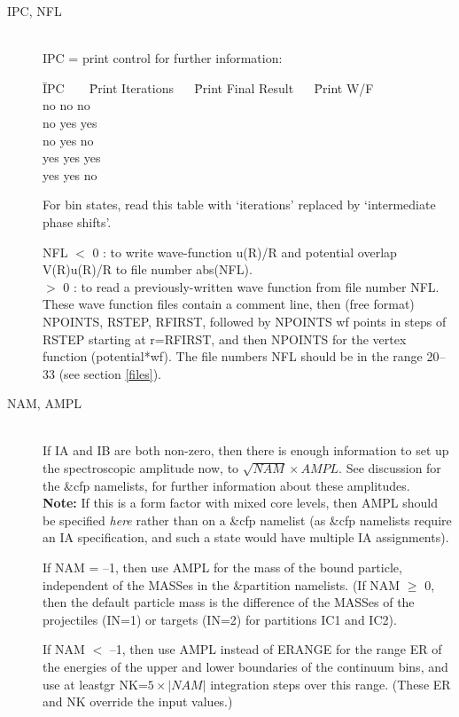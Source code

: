 \documentclass[11pt]{article}
\begin{document}
\begin{description}
\item[IPC, NFL] ~\\
IPC = print control for further information:
%
\begin{tabbing}
\=IPC ~ ~ \=Print Iterations~ ~ \=Print Final Result ~ ~\=Print W/F\\
  \>no \>no \>no\\
  \>no \>yes \>yes\\
  \>no \>yes \>no\\
  \>yes \>yes \>yes\\
  \>yes \>yes \>no\\
\end{tabbing}
For bin states, read this table with `iterations' replaced by `intermediate
phase shifts'.


 NFL
      $<$ 0    : to write wave-function u(R)/R and potential overlap
V(R)u(R)/R to file number abs(NFL).
\\  $>$ 0 : to read a previously-written wave function from file number
NFL.
\\ These wave function files contain a comment line,
then (free format) NPOINTS, RSTEP, RFIRST,
followed by NPOINTS wf points in steps of RSTEP starting at r=RFIRST,
and then NPOINTS for the vertex function (potential*wf).
The file numbers NFL should be in the range 20--33 (see section \ref{files}).

\item[NAM, AMPL]~\\
If IA and IB are both non-zero, then there is enough
information to set up the spectroscopic amplitude now,
to  $\sqrt{NAM} \times AMPL$.
See discussion for the \&cfp namelists, for further information about these amplitudes.\\
{\bf Note:} If this is a form factor with mixed core levels,
then AMPL should be specified {\em here} rather than on a \&cfp namelist
(as \&cfp namelists require an IA specification, and such a state would
have multiple IA assignments).

If NAM = --1, then use AMPL for the mass of the bound particle,
independent of the MASSes in the \&partition namelists.
(If NAM $\geq$ 0, then the default particle mass is the difference of
the MASSes of the projectiles (IN=1) or targets (IN=2) for partitions
IC1 and IC2).

If NAM $<$ --1, then use AMPL instead of ERANGE for the range ER of the
energies of the upper
and lower boundaries of the continuum bins, and use at leastgr
NK=$5\times|NAM|$ integration steps over this range.
(These ER and NK override the input values.)


\end{description}
\end{document}
